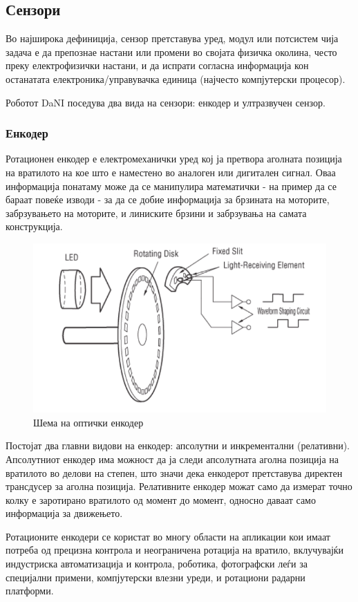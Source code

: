 \documentclass[11pt]{article}
\begin{document}
  \subsection{Сензори}
    Во најширока дефиниција, сензор претставува уред, модул или потсистем чија задача е да препознае настани или промени во својата физичка околина, често преку електрофизички настани, и да испрати согласна информација кон останатата електроника/управувачка единица (најчесто компјутерски процесор).

    Роботот DaNI поседува два вида на сензори: енкодер и ултразвучен сензор.

    \subsubsection{Енкодер}
      Ротационен енкодер е електромеханички уред кој ја претвора аголната позиција на вратилото на кое што е наместено во аналоген или дигитален сигнал. Оваа информација понатаму може да се манипулира математички - на пример да се бараат повеќе изводи - за да се добие информација за брзината на моторите, забрзувањето на моторите, и линиските брзини и забрзувања на самата конструкција.

      \begin{figure}[h]
        \includegraphics[width=0.5\linewidth]{./images/encoder.png}
        \centering
        \caption{Шема на оптички енкодер}
        \label{fig:encoder}
        \end{figure}

		  Постојат два главни видови на енкодер: апсолутни и инкрементални (релативни). Апсолутниот енкодер има можност да ја следи апсолутната аголна позиција на вратилото во делови на степен, што значи дека енкодерот претставува директен трансдусер за аголна позиција.
      Релативните енкодер можат само да измерат точно колку е заротирано вратилото од момент до момент, односно даваат само информација за движењето.

		  Ротационите енкодери се користат во многу области на апликации кои имаат потреба од прецизна контрола и неограничена ротација на вратило, вклучувајќи индустриска автоматизација и контрола, роботика, фотографски леѓи за специјални примени, компјутерски влезни уреди, и ротациони радарни платформи.
\end{document}
